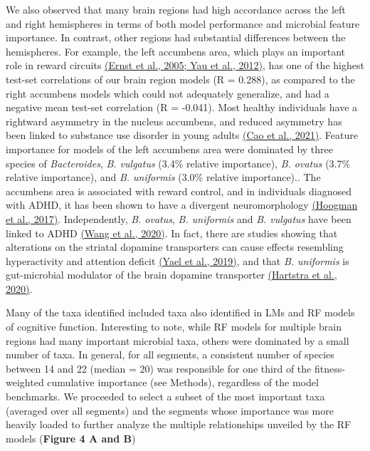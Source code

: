 \documentclass[
]{article}
\begin{document}
We also observed that many brain regions had high accordance across the
left and right hemispheres in terms of both model performance and
microbial feature importance. In contrast, other regions had substantial
differences between the hemispheres. For example, the left accumbens
area, which plays an important role in reward circuits
\href{https://www.zotero.org/google-docs/?zVicU7}{(Ernst et al., 2005;
Yau et al., 2012)}, has one of the highest test-set correlations of our
brain region models (R = 0.288), as compared to the right accumbens
models which could not adequately generalize, and had a negative mean
test-set correlation (R = -0.041). Most healthy individuals have a
rightward asymmetry in the nucleus accumbens, and reduced asymmetry has
been linked to substance use disorder in young adults
\href{https://www.zotero.org/google-docs/?V45KyN}{(Cao et al., 2021)}.
Feature importance for models of the left accumbens area were dominated
by three species of \emph{Bacteroides}, \emph{B. vulgatus} (3.4\%
relative importance), \emph{B. ovatus} (3.7\% relative importance), and
\emph{B. uniformis} (3.0\% relative importance).. The accumbens area is
associated with reward control, and in individuals diagnosed with ADHD,
it has been shown to have a divergent neuromorphology
\href{https://www.zotero.org/google-docs/?kLfEQ5}{(Hoogman et al.,
2017)}. Independently, \emph{B. ovatus}, \emph{B. uniformis} and
\emph{B. vulgatus} have been linked to ADHD
\href{https://www.zotero.org/google-docs/?luO0zh}{(Wang et al., 2020)}.
In fact, there are studies showing that alterations on the striatal
dopamine transporters can cause effects resembling hyperactivity and
attention deficit
\href{https://www.zotero.org/google-docs/?UxS47e}{(Yael et al., 2019)},
and that \emph{B. uniformis} is gut-microbial modulator of the brain
dopamine transporter
\href{https://www.zotero.org/google-docs/?L1cWJS}{(Hartstra et al.,
2020)}.

Many of the taxa identified included taxa also identified in LMs and RF
models of cognitive function. Interesting to note, while RF models for
multiple brain regions had many important microbial taxa, others were
dominated by a small number of taxa. In general, for all segments, a
consistent number of species between 14 and 22 (median = 20) was
responsible for one third of the fitness-weighted cumulative importance
(see Methods), regardless of the model benchmarks. We proceeded to
select a subset of the most important taxa (averaged over all segments)
and the segments whose importance was more heavily loaded to further
analyze the multiple relationships unveiled by the RF models
(\textbf{Figure 4 A and B})
\end{document}
